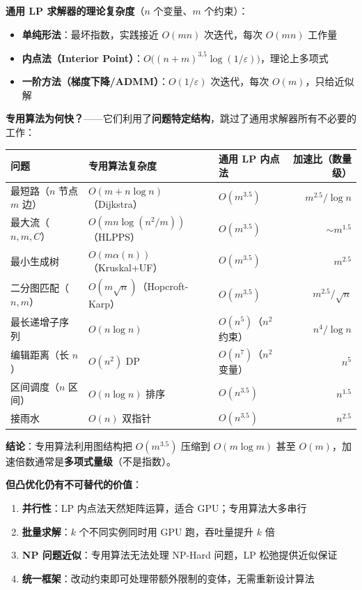 \documentclass[12pt, a4paper]{ctexart}
\begin{document}
\begin{blackboard}

\textbf{通用 LP 求解器的理论复杂度}（$n$ 个变量、$m$ 个约束）：

\begin{itemize}
    \item \textbf{单纯形法}：最坏指数，实践接近 $O(mn)$ 次迭代，每次 $O(mn)$ 工作量
    \item \textbf{内点法（Interior Point）}：$O\!\bigl((n+m)^{3.5} \log(1/\varepsilon)\bigr)$，理论上多项式
    \item \textbf{一阶方法（梯度下降/ADMM）}：$O(1/\varepsilon)$ 次迭代，每次 $O(m)$，只给近似解
\end{itemize}

\textbf{专用算法为何快？}——它们利用了\textbf{问题特定结构}，跳过了通用求解器所有不必要的工作：

\begin{center}
\begin{tabular}{lllr}
\toprule
问题 & 专用算法复杂度 & 通用 LP 内点法 & 加速比（数量级）\\
\midrule
最短路（$n$ 节点 $m$ 边） & $O(m + n\log n)$（Dijkstra） & $O(m^{3.5})$ & $m^{2.5}/\!\log n$ \\
最大流（$n,m,C$） & $O(m n \log(n^2/m))$（HLPPS）& $O(m^{3.5})$ & $\sim m^{1.5}$ \\
最小生成树 & $O(m \alpha(n))$（Kruskal+UF）& $O(m^{3.5})$ & $m^{2.5}$ \\
二分图匹配（$n,m$） & $O(m\sqrt{n})$（Hopcroft-Karp） & $O(m^{3.5})$ & $m^{2.5}/\sqrt{n}$ \\
最长递增子序列 & $O(n\log n)$ & $O(n^{5})$（$n^2$ 约束） & $n^4/\!\log n$ \\
编辑距离（长 $n$） & $O(n^2)$ DP & $O(n^7)$（$n^2$ 变量） & $n^5$ \\
区间调度（$n$ 区间） & $O(n\log n)$ 排序 & $O(n^{3.5})$ & $n^{1.5}$ \\
接雨水 & $O(n)$ 双指针 & $O(n^{3.5})$ & $n^{2.5}$ \\
\bottomrule
\end{tabular}
\end{center}

\textbf{结论}：专用算法利用图结构把 $O(m^{3.5})$ 压缩到 $O(m \log m)$ 甚至 $O(m)$，加速倍数通常是\textbf{多项式量级}（不是指数）。

\textbf{但凸优化仍有不可替代的价值}：
\begin{enumerate}
    \item \textbf{并行性}：LP 内点法天然矩阵运算，适合 GPU；专用算法大多串行
    \item \textbf{批量求解}：$k$ 个不同实例同时用 GPU 跑，吞吐量提升 $k$ 倍
    \item \textbf{NP 问题近似}：专用算法无法处理 NP-Hard 问题，LP 松弛提供近似保证
    \item \textbf{统一框架}：改动约束即可处理带额外限制的变体，无需重新设计算法
\end{enumerate}

\end{blackboard}
\end{document}
